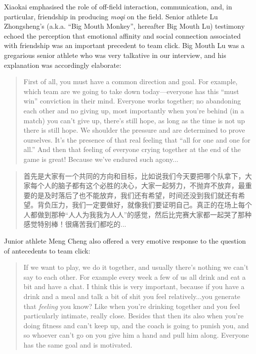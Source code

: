 \begin{CJK}{UTF8}{gbsn}
Xiaokai emphasised the role of off-field interaction, communication, and, in particular, friendship in producing \textit{moqi} on the field.  Senior athlete Lu Zhongsheng’s (a.k.a. ``Big Mouth Monkey'', hereafter Big Mouth Lu) testimony echoed the perception that emotional affinity and social connection associated with friendship was an important precedent to team click. Big Mouth Lu was a gregarious senior athlete who was very talkative in our interview, and his explanation was accordingly elaborate:

    \begin{quote}
      First of all, you must have a common direction and goal.  For example, which team are we going to take down today---everyone has this ``must win'' conviction in their mind.  Everyone works together; no abandoning each other and no giving up, most importantly when you’re behind (in a match) you can’t give up, there’s still hope, as long as the time is not up there is still hope.  We shoulder the pressure and are determined to prove ourselves.  It's the presence of that real feeling that ``all for one and one for all.''  And then that feeling of everyone crying together at the end of the game is great! Because we've endured such agony...
    \end{quote}

    \begin{quote}
      首先是大家有一个共同的方向和目标，比如说我们今天要把哪个队拿下，大家每个人的脑子都有这个必胜的决心，大家一起努力，不抛弃不放弃，最重要的是及时落后了也不能放弃，我们还有希望，时间还没到我们就还有希望。背负压力，我们一定要做好，就像我们要证明自己。真正的在场上每个人都做到那种“人人为我我为人人”的感觉，然后比完赛大家都一起哭了那种感觉特别棒！很痛苦我们都吃的...
    \end{quote}

Junior athlete Meng Cheng also offered a very emotive response to the question of antecedents to team click:

      \begin{quote}
        If we want to play, we do it together, and usually there’s nothing we can’t say to each other.  For example every week a few of us all drink and eat a bit and have a chat.  I think this is very important, because if you have a drink and a meal and talk a bit of shit you feel relatively...you generate that \textit{feeling} you know? Like when you’re drinking together and you feel particularly intimate, really close.  Besides that then its also when you’re doing fitness and can’t keep up, and the coach is going to punish you, and so whoever can’t go on you give him a hand and pull him along.  Everyone has the same goal and is motivated.
      \end{quote}


\end{CJK}
